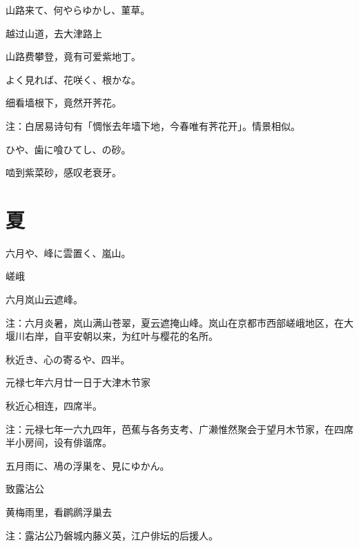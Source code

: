 \begin{haiku}
    {\FH 山路来て、何やらゆかし、菫草。}

    {\FK 越过山道，去大津路上}

    {\FK 山路费攀登，竟有可爱紫地丁。}
\end{haiku}

\begin{haiku}
    {\FH よく見れば、花咲く、根かな。}

    {\FK 细看墙根下，竟然开荠花。}

    {\FT 注：白居易诗句有「惆怅去年墙下地，今春唯有荠花开」。情景相似。}
\end{haiku}

\begin{haiku}
    {\FH {}ひや、歯に喰ひてし、の砂。}

    {\FK 啮到紫菜砂，感叹老衰牙。}
\end{haiku}

\section{\FK 夏}

\setcounter{haikucounter}{0}

\begin{haiku}
    {\FH 六月や、峰に雲置く、嵐山。}

    {\FK 嵯峨}

    {\FK 六月岚山云遮峰。}

    {\FT 注：六月炎暑，岚山满山苍翠，夏云遮掩山峰。岚山在京都市西部嵯峨地区，在大堰川右岸，自平安朝以来，为红叶与樱花的名所。}
\end{haiku}

\begin{haiku}
    {\FH 秋近き、心の寄るや、四半。}

    {\FK 元禄七年六月廿一日于大津木节家}

    {\FK 秋近心相连，四席半。}

    {\FT 注：元禄七年一六九四年，芭蕉与各务支考、广濑惟然聚会于望月木节家，在四席半小房间，设有俳谐席。}
\end{haiku}

\begin{haiku}
    {\FH 五月雨に、鳰の浮巣を、見にゆかん。}

    {\FK 致露沾公}

    {\FK 黄梅雨里，看䴙䴘浮巢去}

    {\FT 注：露沾公乃磐城内藤义英，江户俳坛的后援人。}
\end{haiku}

